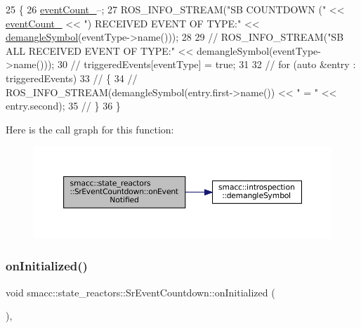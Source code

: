 \begin{DoxyCode}
25 \{
26     \hyperlink{classsmacc_1_1state__reactors_1_1SrEventCountdown_aa3b1de656f3d3cadadc47f00c4e0be86}{eventCount\_}--;
27     ROS\_INFO\_STREAM(\textcolor{stringliteral}{"SB COUNTDOWN ("} << \hyperlink{classsmacc_1_1state__reactors_1_1SrEventCountdown_aa3b1de656f3d3cadadc47f00c4e0be86}{eventCount\_} << \textcolor{stringliteral}{") RECEIVED EVENT OF TYPE:"} << 
      \hyperlink{namespacesmacc_1_1introspection_a2f495108db3e57604d8d3ff5ef030302}{demangleSymbol}(eventType->name()));
28 
29     \textcolor{comment}{// ROS\_INFO\_STREAM("SB ALL RECEIVED EVENT OF TYPE:" << demangleSymbol(eventType->name()));}
30     \textcolor{comment}{// triggeredEvents[eventType] = true;}
31 
32     \textcolor{comment}{// for (auto &entry : triggeredEvents)}
33     \textcolor{comment}{// \{}
34     \textcolor{comment}{//     ROS\_INFO\_STREAM(demangleSymbol(entry.first->name()) << " = " << entry.second);}
35     \textcolor{comment}{// \}}
36 \}
\end{DoxyCode}
Here is the call graph for this function\+:
\nopagebreak
\begin{figure}[H]
\begin{center}
\leavevmode
\includegraphics[width=350pt]{classsmacc_1_1state__reactors_1_1SrEventCountdown_a6cc15cf6633bd882ac40a87d698b3b6b_cgraph}
\end{center}
\end{figure}
\mbox{\label{classsmacc_1_1state__reactors_1_1SrEventCountdown_a1bd7afbf283ade29f9305f0c3a64ef94}} 
\subsubsection{\texorpdfstring{on\+Initialized()}{onInitialized()}}
{\footnotesize\ttfamily void smacc\+::state\+\_\+reactors\+::\+Sr\+Event\+Countdown\+::on\+Initialized (\begin{DoxyParamCaption}{ }\end{DoxyParamCaption})\hspace{0.3cm}{\ttfamily [override]}, {\ttfamily [virtual]}}



